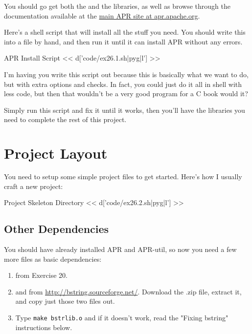 You should go get both the  and the 
libraries, as well as browse through the documentation available at the 
\href{http://apr.apache.org/}{main APR site at apr.apache.org}.

Here's a shell script that will install all the stuff you need.  You
should write this into a file by hand, and then run it until it can
install APR without any errors.

\begin{code}{APR Install Script}
<< d['code/ex26.1.sh|pyg|l'] >>
\end{code}

I'm having you write this script out because this is basically what
we want  to do, but with extra options and checks.
In fact, you could just do it all in shell with less code, but then
that wouldn't be a very good program for a C book would it?

Simply run this script and fix it until it works, then you'll have the
libraries you need to complete the rest of this project.


\section{Project Layout}

You need to setup some simple project files to get started.  Here's how I
usually craft a new project:

\begin{code}{Project Skeleton Directory}
<< d['code/ex26.2.sh|pyg|l'] >>
\end{code}

\subsection{Other Dependencies}

You should have already installed APR and APR-util, so now you need 
a few more files as basic dependencies:

\begin{enumerate}
\item {} from Exercise 20.
\item {} and  from \href{http://bstring.sourceforge.net/}{http://bstring.sourceforge.net/}. Download the .zip file, extract it, and copy just those two files out.
\item Type \verb|make bstrlib.o| and if it doesn't work, read the "Fixing bstring" 
    instructions below.
\end{enumerate}

